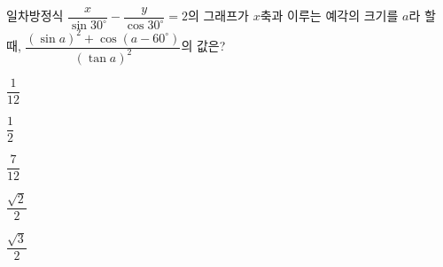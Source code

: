 일차방정식 $\dfrac{x}{\sin 30^\circ}-\dfrac{y}{\cos 30^\circ}=2$의 그래프가 $x$축과 이루는 예각의 크기를 $a$라 할 때, $\dfrac{(\sin a)^2+\cos(a-60^\circ)}{(\tan a)^2}$의 값은?
\begin{choices32}{\rule[-3ex]{0pt}{8ex}$\dfrac{1}{12}$}{\rule[-3ex]{0pt}{8ex}$\dfrac{1}{2}$}{\rule[-3ex]{0pt}{8ex}$\dfrac{7}{12}$}{\rule[-3ex]{0pt}{8ex}$\dfrac{\sqrt{2}}{2}$}{\rule[-3ex]{0pt}{8ex}$\dfrac{\sqrt{3}}{2}$}\end{choices32}
